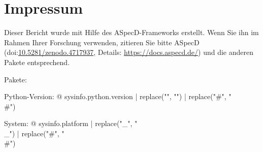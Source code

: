 \section*{Impressum}

Dieser Bericht wurde mit Hilfe des ASpecD-Frameworks erstellt. Wenn Sie ihn im Rahmen Ihrer Forschung verwenden, zitieren Sie bitte ASpecD (doi:\href{https://doi.org/10.5281/zenodo.4717937}{10.5281/zenodo.4717937}, Details: \url{https://docs.aspecd.de/}) und die anderen Pakete entsprechend.

Pakete: %


Python-Version: {@ sysinfo.python.version | replace("\n", "") | replace("#", "\\#") }

System: {@ sysinfo.platform | replace("_", "\\_") | replace("#", "\\#") }
